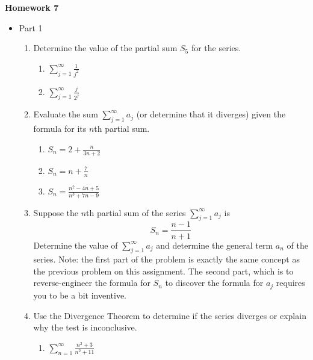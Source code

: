 \documentclass{article}
\begin{document}
\begin{center}
    \large \textbf{Homework 7}
\end{center}
        \begin{itemize}
            \item Part 1
                \begin{enumerate}
                    \item Determine the value of the partial sum $S_5$ for the series.
                        \begin{enumerate}
                            \item $\displaystyle \sum_{j=1}^\infty \frac{1}{j^2}$
                            \item $\displaystyle \sum_{j=1}^\infty \frac{j}{2^j}$
                        \end{enumerate}
                    \item Evaluate the sum $\displaystyle \sum_{j=1}^\infty a_j$ (or determine that it diverges) given the formula for its $n$th partial sum.
                        \begin{enumerate}
                            \item $\displaystyle S_n = 2+\frac{n}{3n+2}$
                            \item $\displaystyle S_n = n+\frac{7}{n}$
                            \item $\displaystyle S_n = \frac{n^2-4n+5}{n^3+7n-9}$
                        \end{enumerate}
                    \item Suppose the $n$th partial sum of the series $\displaystyle \sum_{j=1}^\infty a_j$ is $$S_n = \frac{n-1}{n+1}$$  Determine the value of $\displaystyle \sum_{j=1}^\infty a_j$ and determine the general term $a_n$ of the series. Note: the first part of the problem is exactly the same concept as the previous problem on this assignment. The second part, which is to reverse-engineer the formula for $S_n$ to discover the formula for $a_j$ requires you to be a bit inventive. 
                    \item Use the Divergence Theorem to determine if the series diverges or explain why the test is inconclusive.  
                        \begin{enumerate}
                            \item $\displaystyle \sum_{n=1}^\infty \frac{n^2+3}{n^2+11}$

\end{enumerate}
\end{enumerate}
\end{itemize}
\end{document}
